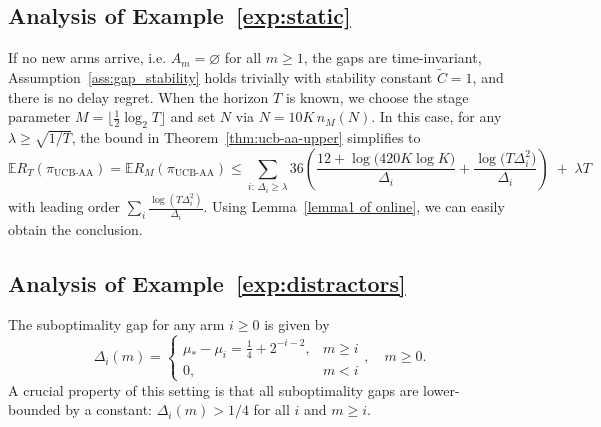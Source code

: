 \documentclass[11pt]{article}
\begin{document}
\subsection{Analysis of Example~\ref{exp:static}}\label{sec:Analysis of exp:static}
If no new
arms arrive, i.e. $A_m=\varnothing$ for all $m\ge 1$, the gaps are time-invariant, Assumption~\ref{ass:gap_stability} holds trivially with stability constant $\widetilde C=1$, and there is no delay regret. When the horizon $T$ is known, we choose the stage parameter $M=\lfloor \tfrac12\log_2 T\rfloor$ and set $N$ via $N=10K\,n_M(N)$.
In this case, for any $\lambda\ge \sqrt{1/T}$, the bound in Theorem~\ref{thm:ucb-aa-upper} simplifies to
\[
\mathbb{E}R_T(\pi_{\mathrm{UCB\text{-}AA}})=\mathbb{E}R_M(\pi_{\mathrm{UCB\text{-}AA}})
\le
\sum_{i:\,\Delta_i\ge \lambda}
36\left(\frac{12+ \log\bigl( 420K\log K \bigr)  }{\Delta_i}+\frac{\log\bigl( T \Delta_i^2\bigr)}{\Delta_i}\right)
\;+\;\lambda T
\]
with leading order
\(
\sum_i \frac{\log(T\Delta_i^2)}{\Delta_i}.
\)
Using Lemma~\ref{lemma1 of online}, we can easily obtain the conclusion.

\subsection{Analysis of Example~\ref{exp:distractors}}\label{sec:Analysis of exp:distractors}
The suboptimality gap for any arm $i \ge 0$ is given by 
\[\Delta_i(m)=\begin{cases}
    \mu_{*} - \mu_i = \frac{1}{4} + 2^{-i-2}, & m\geq i\\
    0,&m< i
\end{cases},\quad m\geq 0.\]
A crucial property of this setting is that all suboptimality gaps are lower-bounded by a constant: $\Delta_i(m) > 1/4$ for all $i$ and $m\geq i$.
\end{document}
